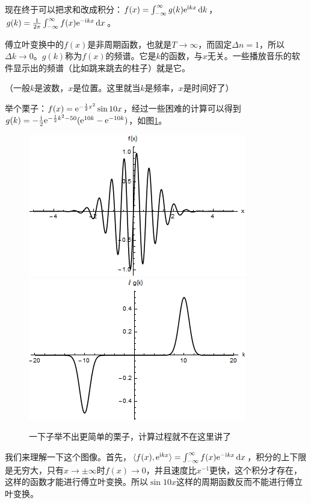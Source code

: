 现在终于可以把求和改成积分：$f(x)=\int_{-\infty}^{\infty} g(k) \mathrm{e}^{\mathrm{i} k x} \mathop{}\!\mathrm{d} k$，$g(k)=\frac{1}{2 \pi} \int_{-\infty}^{\infty} f(x) \mathrm{e}^{-\mathrm{i} k x} \mathop{}\!\mathrm{d} x$。

傅立叶变换中的$f(x)$是非周期函数，也就是$T \rightarrow \infty$，而固定$\Delta n=1$，所以$\Delta k \rightarrow 0$。$g(k)$称为$f(x)$的频谱。它是$k$的函数，与$x$无关。一些播放音乐的软件显示出的频谱（比如跳来跳去的柱子）就是它。

（一般$k$是波数，$x$是位置。这里就当$k$是频率，$x$是时间好了）

举个栗子：$f(x)=\mathrm{e}^{-\frac{1}{2} x^2} \sin 10 x$，经过一些困难的计算可以得到$g(k)=-\frac{\mathrm{i}}{2} \mathrm{e}^{-\frac{1}{2} k^2-50}(\mathrm{e}^{10 k}-\mathrm{e}^{-10 k})$，如图\ref{fig-gauss-sin10x}。
\begin{figure}[htb]
\centering
\includegraphics[scale=0.5]{fig/gauss-sin10x}
\includegraphics[scale=0.5]{fig/gauss-sin10x-g}
\caption{一下子举不出更简单的栗子，计算过程就不在这里讲了}
\label{fig-gauss-sin10x}
\end{figure}

我们来理解一下这个图像。首先，$\langle f(x),\mathrm{e}^{\mathrm{i} k x} \rangle=\int_{-\infty}^{\infty} f(x) \mathrm{e}^{-\mathrm{i} k x} \mathop{}\!\mathrm{d} x$，积分的上下限是无穷大，只有$x \rightarrow \pm \infty$时$f(x) \rightarrow 0$，并且速度比$x^{-1}$更快，这个积分才存在，这样的函数才能进行傅立叶变换。所以$\sin 10 x$这样的周期函数反而不能进行傅立叶变换。

